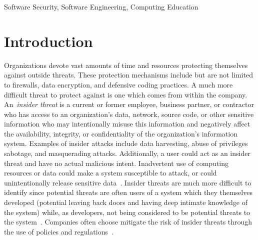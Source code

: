 \documentclass[conference]{IEEEtran}
\newcommand{\todo}[1]{\textcolor{cyan}{\textbf{[#1]}}}
\begin{document}
\begin{IEEEkeywords} Software Security, Software Engineering, Computing Education\end{IEEEkeywords}







\section{Introduction}




Organizations devote vast amounts of time and resources protecting themselves against outside threats. These protection mechanisms include but are not limited to firewalls, data encryption, and defensive coding practices. A much more difficult threat to protect against is one which comes from within the company. An~\emph{insider threat} is a current or former employee, business partner, or contractor who has access to an organization's data, network, source code, or other sensitive information who may intentionally misuse this information and negatively affect the availability, integrity, or confidentiality of the organization's information system. Examples of insider attacks include data harvesting, abuse of privileges sabotage, and masquerading attacks. Additionally, a user could act as an insider threat and have no actual malicious intent. Inadvertent use of computing resources or data could make a system susceptible to attack, or could unintentionally release sensitive data~\cite{capp_bibtex}. Insider threats are much more difficult to identify since potential threats are often users of a system which they themselves developed (potential leaving back doors and having deep intimate knowledge of the system) while, as developers, not being considered to be potential threats to the system~\cite{Nostro:2014:ITA:2694737.2694740}. Companies often choose mitigate the risk of insider threats through the use of policies and regulations~\cite{5137280}.
\end{document}
